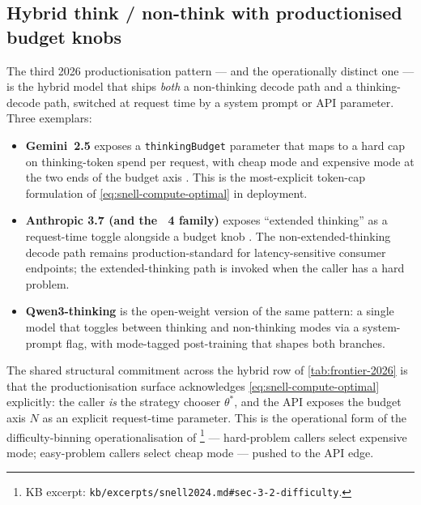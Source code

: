 \subsection{Hybrid think / non-think with productionised budget knobs}
\label{sec:frontier-hybrid-budget}

The third 2026 productionisation pattern --- and the operationally
distinct one --- is the hybrid model that ships \emph{both} a
non-thinking decode path and a thinking-decode path, switched at
request time by a system prompt or API parameter. Three exemplars:

\begin{itemize}
\item \textbf{Gemini~2.5} \citep{gemini2-5} exposes a
\texttt{thinkingBudget} parameter that maps to a hard cap on
thinking-token spend per request, with cheap mode and expensive mode at
the two ends of the budget axis .
This is the most-explicit token-cap formulation of
\cref{eq:snell-compute-optimal} in deployment.
\item \textbf{Anthropic  3.7 (and the ~4 family)} exposes
``extended thinking'' as a request-time toggle alongside a budget knob
. The non-extended-thinking decode path remains
production-standard for latency-sensitive consumer endpoints; the
extended-thinking path is invoked when the caller has a hard problem.
\item \textbf{Qwen3-thinking} 
is the open-weight version of the same pattern: a single model that
toggles between thinking and non-thinking modes via a system-prompt
flag, with mode-tagged post-training that shapes both branches.
\end{itemize}

The shared structural commitment across the hybrid row of
\cref{tab:frontier-2026} is that the productionisation surface
acknowledges \cref{eq:snell-compute-optimal} explicitly: the caller
\emph{is} the strategy chooser $\theta^\ast$, and the API exposes the
budget axis $N$ as an explicit request-time parameter. This is the
operational form of the difficulty-binning operationalisation of
\citet[\S 3.2]{snell2024}\footnote{KB excerpt:
\nolinkurl{kb/excerpts/snell2024.md#sec-3-2-difficulty}.} ---
hard-problem callers select expensive mode; easy-problem callers
select cheap mode --- pushed to the API edge.

